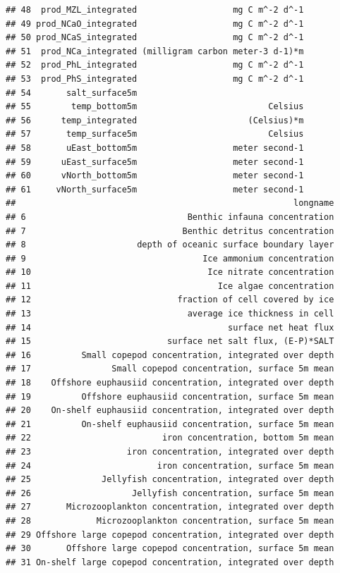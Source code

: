 \documentclass[
]{article}
\begin{document}
\begin{verbatim}
## 48  prod_MZL_integrated                   mg C m^-2 d^-1
## 49 prod_NCaO_integrated                   mg C m^-2 d^-1
## 50 prod_NCaS_integrated                   mg C m^-2 d^-1
## 51  prod_NCa_integrated (milligram carbon meter-3 d-1)*m
## 52  prod_PhL_integrated                   mg C m^-2 d^-1
## 53  prod_PhS_integrated                   mg C m^-2 d^-1
## 54       salt_surface5m                                 
## 55        temp_bottom5m                          Celsius
## 56      temp_integrated                      (Celsius)*m
## 57       temp_surface5m                          Celsius
## 58       uEast_bottom5m                   meter second-1
## 59      uEast_surface5m                   meter second-1
## 60      vNorth_bottom5m                   meter second-1
## 61     vNorth_surface5m                   meter second-1
##                                                       longname
## 6                                Benthic infauna concentration
## 7                               Benthic detritus concentration
## 8                      depth of oceanic surface boundary layer
## 9                                   Ice ammonium concentration
## 10                                   Ice nitrate concentration
## 11                                     Ice algae concentration
## 12                             fraction of cell covered by ice
## 13                               average ice thickness in cell
## 14                                       surface net heat flux
## 15                           surface net salt flux, (E-P)*SALT
## 16          Small copepod concentration, integrated over depth
## 17                Small copepod concentration, surface 5m mean
## 18    Offshore euphausiid concentration, integrated over depth
## 19          Offshore euphausiid concentration, surface 5m mean
## 20    On-shelf euphausiid concentration, integrated over depth
## 21          On-shelf euphausiid concentration, surface 5m mean
## 22                          iron concentration, bottom 5m mean
## 23                   iron concentration, integrated over depth
## 24                         iron concentration, surface 5m mean
## 25              Jellyfish concentration, integrated over depth
## 26                    Jellyfish concentration, surface 5m mean
## 27       Microzooplankton concentration, integrated over depth
## 28             Microzooplankton concentration, surface 5m mean
## 29 Offshore large copepod concentration, integrated over depth
## 30       Offshore large copepod concentration, surface 5m mean
## 31 On-shelf large copepod concentration, integrated over depth

\end{verbatim}
\end{document}
